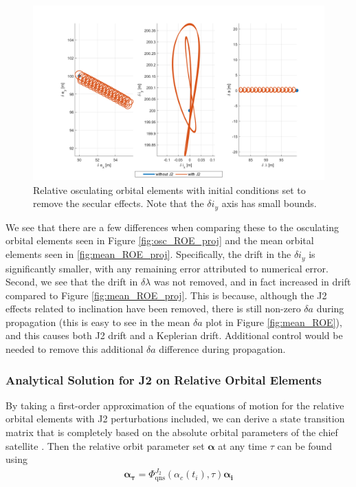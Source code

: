 \begin{figure}[H]
    \centering
    \includegraphics[width=0.8\linewidth]{sim/figures/PS4/ROE_projections_osc_no_drift_SV2.png}
    \caption{Relative osculating orbital elements with initial conditions set to remove the secular effects. Note that the $\delta i_y$ axis has small bounds.}
    \label{fig:rel_roe_no_drift_osc}
\end{figure}

We see that there are a few differences when comparing these to the osculating orbital elements seen in Figure \ref{fig:osc_ROE_proj} and the mean orbital elements seen in \ref{fig:mean_ROE_proj}. Specifically, the drift in the $\delta i_y$ is significantly smaller, with any remaining error attributed to numerical error. Second, we see that the drift in $\delta \lambda$ was not removed, and in fact increased in drift compared to Figure \ref{fig:mean_ROE_proj}. This is because, although the J2 effects related to inclination have been removed, there is still non-zero $\delta a$ during propagation (this is easy to see in the mean $\delta a$ plot in Figure \ref{fig:mean_ROE}), and this causes both J2 drift and a Keplerian drift. Additional control would be needed to remove this additional $\delta a$ difference during propagation.

\subsubsection{Analytical Solution for J2 on Relative Orbital Elements} \label{sec:j2_analytical_roe}

By taking a first-order approximation of the equations of motion for the relative orbital elements with J2 perturbations included, we can derive a state transition matrix that is completely based on the absolute orbital parameters of the chief satellite \cite{koenig2017new}. Then the relative orbit parameter set $\boldsymbol{\alpha}$ at any time $\tau$ can be found using
\begin{align}
    \boldsymbol{\alpha_{\tau}} = \Phi^{J_2}_{\text{qns}}(\alpha_c(t_i), \tau) \boldsymbol{\alpha_{i}} \label{eq:state_transition_relation}
\end{align}

